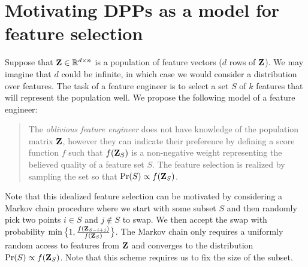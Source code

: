 \documentclass[12pt]{sty/colt2019/colt2018-arxiv}
\begin{document}
\section{Motivating DPPs as a model for feature selection}
Suppose that $\mathbf Z\in\mathbb R^{d\times n}$ is a population of feature vectors
($d$ rows of $\mathbf Z$). We may imagine that $d$ could be infinite, in
which case we would consider a distribution over features.
The task of a feature engineer is to select a set $S$ of $k$
features that will represent the population well. We propose the following model of a
feature engineer:
\begin{quote}
The \emph{oblivious feature engineer} does not have knowledge of the
population matrix $\mathbf Z$, however they 
can indicate their preference by defining a score function $f$ such that
$f(\mathbf Z_S)$ is a non-negative weight representing the believed quality
of a feature set $S$. The feature selection is realized by sampling
the set so that $\mathrm{Pr}(S)\propto f(\mathbf Z_S)$.
\end{quote}
Note that this idealized feature selection can be motivated by
considering a Markov chain procedure where we start with some subset
$S$ and then randomly pick two points $i\in S$ and $j\not\in S$ to
swap. We then accept the swap with probability
$\min\big\{1,\frac{f(\mathbf Z_{S-i+j})}{f(\mathbf Z_S)}\big\}$. The Markov chain
only requires a uniformly random access to features from $\mathbf Z$ and
converges to the distribution $\mathrm{Pr}(S)\propto
f(\mathbf Z_S)$. Note that this scheme requires us to fix the size
of the subset.
\end{document}

